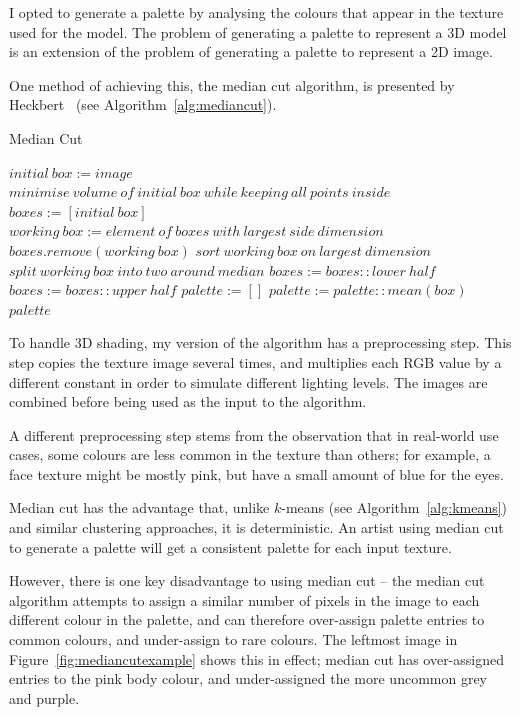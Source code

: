 \documentclass[12pt,twoside,notitlepage]{report}
\begin{document}
I opted to generate a palette by analysing the colours that appear in the texture used for the model. The problem of generating a palette to represent a 3D model is an extension of the problem of generating a palette to represent a 2D image.

One method of achieving this, the median cut algorithm, is presented by Heckbert~\cite{Heckbert:1982:CIQ:965145.801294} (see Algorithm~\ref{alg:mediancut}).

\begin{algorithm}
\caption{Median Cut}
\label{alg:mediancut}
\begin{algorithmic}[1]
\State$initial\ box := image$
\State$minimise\ volume\ of\ initial\ box\ while\ keeping\ all\ points\ inside$
\State$boxes := [initial\ box]$
	\State$working\ box := element\ of\ boxes\ with\ largest\ side\ dimension$
	\State$boxes.remove(working\ box)$
	\State$sort\ working\ box\ on\ largest\ dimension$
	\State$split\ working\ box\ into\ two\ around\ median$
	\State$boxes := boxes :: lower\ half$
	\State$boxes := boxes :: upper\ half$
\EndWhile
\State$palette := []$
	\State$palette := palette :: mean(box)$
\EndFor
\State\Return$palette$
\end{algorithmic}
\end{algorithm}

To handle 3D shading, my version of the algorithm has a preprocessing step. This step copies the texture image several times, and multiplies each RGB value by a different constant in order to simulate different lighting levels. The images are combined before being used as the input to the algorithm.

A different preprocessing step stems from the observation that in real-world use cases, some colours are less common in the texture than others; for example, a face texture might be mostly pink, but have a small amount of blue for the eyes.

Median cut has the advantage that, unlike $k$-means (see Algorithm~\ref{alg:kmeans}) and similar clustering approaches, it is deterministic. An artist using median cut to generate a palette will get a consistent palette for each input texture.

However, there is one key disadvantage to using median cut -- the median cut algorithm attempts to assign a similar number of pixels in the image to each different colour in the palette, and can therefore over-assign palette entries to common colours, and under-assign to rare colours. The leftmost image in Figure~\ref{fig:mediancutexample} shows this in effect; median cut has over-assigned entries to the pink body colour, and under-assigned the more uncommon grey and purple.
\end{document}
